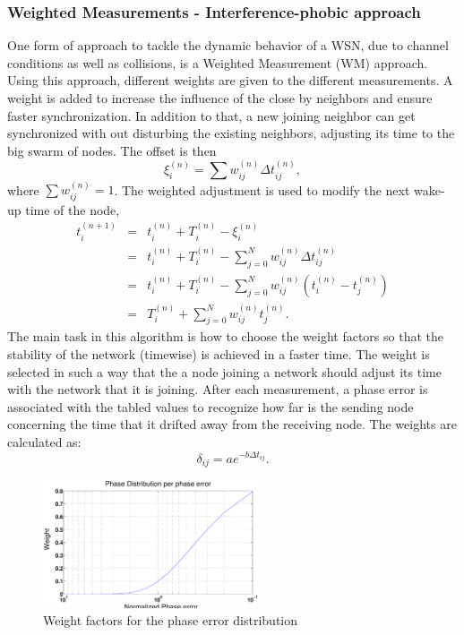 \documentclass[journal]{IEEEtran}
\begin{document}
\subsubsection{\textbf{Weighted Measurements - Interference-phobic approach}}
One form of approach to tackle the dynamic behavior of a WSN, due to channel conditions as well as collisions, is a
Weighted Measurement (WM) approach. Using this approach, different
weights are given to the different measurements. A weight is added to
increase the influence of the close by neighbors and ensure
faster synchronization. In addition to that, a new joining neighbor
can get synchronized with out disturbing the existing neighbors,
adjusting its time to the big swarm of nodes.\newline
The offset is then
\begin{equation}
\xi_i^{(n)} = \sum{w_{ij}^{(n)}\Delta t_{ij}^{(n)}} ,
\end{equation}
where $\sum{w_{ij}^{(n)}= 1}$.
\newline
The weighted adjustment is used to modify the next wake-up time of
the node,
\begin{eqnarray*}
t_i^{(n+1)} &=& t_i^{(n)} + T_i^{(n)} - \xi_i^{(n)} \\ &=& t_i^{(n)}
+ T_i^{(n)} - \sum_{j=0}^N{w_{ij}^{(n)}\Delta t_{ij}^{(n)}} \\ &=&
t_i^{(n)}+ T_i^{(n)} -
\sum_{j=0}^N{w_{ij}^{(n)}(t_i^{(n)}-t_j^{(n)})} \\ &=& T_i^{(n)} + \sum_{j=0}^N{w_{ij}^{(n)}t_j^{(n)}}.
\end{eqnarray*}
\newline
The main task in this algorithm is how to choose the weight factors so that the stability of the network (timewise) is achieved in a faster time. The weight is selected in such a way that the a node joining a network should adjust its time with the network that it is joining. After
each measurement, a phase error is associated with the tabled values to recognize how far is the sending node concerning the time that it
drifted away from the receiving node. The weights are calculated as:
\begin{equation}
\delta_{ij} = ae^{-b\Delta t_{ij}}.
\end{equation}
\begin{figure}[t]
\centering
\includegraphics[width= 2.5in]{weight}
\caption{Weight factors for the phase error distribution}
\label{weight}
\end{figure}
\end{document}
